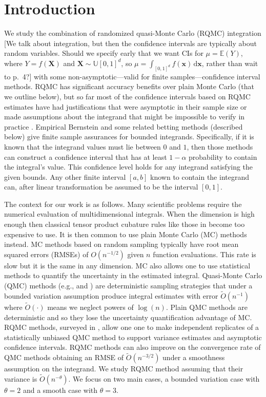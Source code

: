 \documentclass{article}
\newcommand{\fred}[1]{\begingroup\color{red}#1\endgroup}
\begin{document}
\section{Introduction}

We study the combination of randomized quasi-Monte
Carlo (RQMC) integration \fred{[We talk about integration, but then the confidence intervals are typically about random variables.  Should we specify early that we want CIs for $\mu = \mathbb{E}(Y)$, where $Y = f(\boldsymbol{X})$ and $\boldsymbol{X} \sim \mathbb{U}[0,1]^d$, so $\mu = \int_{[0,1]^d} f(\boldsymbol{x}) \, \mathrm{d} \boldsymbol{x}$, rather than wait to p.\ 4?]} 
with some non-asymptotic\fred{---valid for finite samples---}confidence interval methods.
RQMC has significant accuracy  benefits over plain Monte Carlo (that
we outline below), but so far most of the confidence intervals based on
RQMC estimates have had justifications that were asymptotic
in their sample size \fred{\cite{LEcEtal24a} or made assumptions about the integrand that might be impossible to verify in practice \cite{HicJim16a,JimHic16a}}.  Empirical Bernstein and some related betting
methods (described below) give finite sample assurances for bounded integrands.  Specifically, if it is known that the integrand values must lie
between $0$ and $1$, then those methods can construct a confidence
interval that has at least $1-\alpha$ probability to contain
the integral's value.  This confidence level holds for any integrand
satisfying the given bounds.  Any other finite interval $[a,b]$ known
to contain the integrand can, after linear transformation
be assumed to be the interval $[0,1]$.

The context for our work is as follows.
Many scientific problems require the numerical 
evaluation of multidimensional
integrals. When the dimension is high enough then classical \fred{tensor product cubature} rules 
like those in \cite{DavRab84} become too expensive to use. It is then
common to use plain Monte Carlo (MC) methods instead.  MC
methods based on random sampling typically have root mean
squared errors (RMSEs) of $O(n^{-1/2})$ given $n$
function evaluations.  This rate is slow but it is the
same in any dimension.  MC also allows one to use statistical
methods to quantify the uncertainty in the estimated
integral.  Quasi-Monte Carlo (QMC) 
methods (e.g.,  \cite{DicPil10a} and \cite{Nie92}) are deterministic
sampling strategies that under a bounded variation assumption
produce integral estimates with error $\tilde O(n^{-1})$ where
$\tilde O(\cdot)$ means we neglect powers of $\log(n)$.
Plain QMC methods are deterministic and so they lose the
uncertainty quantification advantage of MC. RQMC methods, 
surveyed in \cite{LEcLem02a}, allow one
one to make independent replicates of a statistically
unbiased QMC method to support variance estimates and
asymptotic confidence intervals.  RQMC methods can also
improve on the convergence rate of QMC methods obtaining
an RMSE of $\tilde O(n^{-3/2})$ under a smoothness assumption
\cite{Owe97,Owe08a} on the integrand.  We study RQMC
method assuming that their variance is $\tilde O(n^{-\theta})$.
We focus on two main cases, a bounded variation case with
$\theta=2$ and a smooth case with $\theta=3$.
\end{document}

